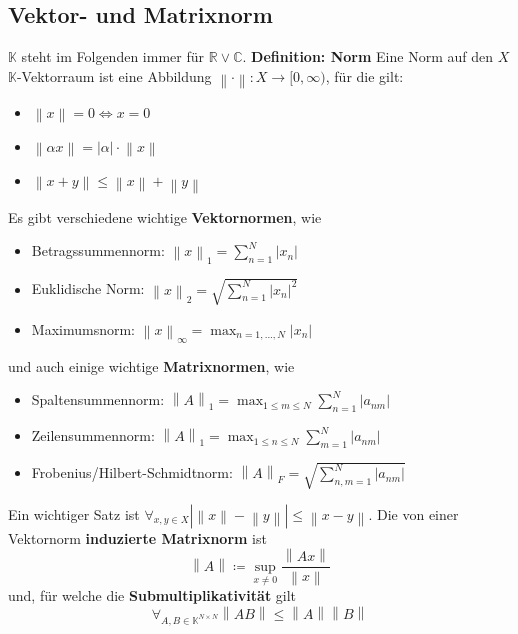 \documentclass{article}
\newcommand\norm[1]{\left\lVert#1\right\rVert}
\begin{document}
\subsection{Vektor- und Matrixnorm}
    $\mathbb{K}$ steht im Folgenden immer für $\mathbb{R}\vee\mathbb{C}$.\newline
    \textbf{Definition: Norm}\newline
    Eine Norm auf den $X$ $\mathbb{K}$-Vektorraum ist eine Abbildung 
    $\norm{\cdot}:X\rightarrow[0,\infty)$, für die gilt:
    \begin{itemize}
        \item $\norm{x}=0 \Leftrightarrow x=0$
        \item $\norm{\alpha x}=|\alpha|\cdot \norm{x}$
        \item $\norm{x+y}\le \norm{x}+\norm{y}$
    \end{itemize}
    Es gibt verschiedene wichtige \textbf{Vektornormen}, wie
    \begin{itemize}
        \item Betragssummennorm: $\norm{x}_1=\sum_{n=1}^N|x_n|$
        \item Euklidische Norm: $\norm{x}_2=\sqrt{\sum_{n=1}^N|x_n|^2}$
        \item Maximumsnorm: $\norm{x}_\infty=\max_{n=1,...,N}|x_n|$
    \end{itemize}
    und auch einige wichtige \textbf{Matrixnormen}, wie
    \begin{itemize}
        \item Spaltensummennorm: $\norm{A}_1=\max_{1\le m\le N}\sum_{n=1}^N|a_{nm}|$
        \item Zeilensummennorm: $\norm{A}_1=\max_{1\le n\le N}\sum_{m=1}^N|a_{nm}|$
        \item Frobenius/Hilbert-Schmidtnorm: $\norm{A}_F=\sqrt{\sum_{n,m=1}^N|a_{nm}|}$
    \end{itemize}
    Ein wichtiger Satz ist $\forall_{x,y\in X}|\norm{x}-\norm{y}|\le \norm{x-y}$.\newline
    Die von einer Vektornorm \textbf{induzierte Matrixnorm} ist
    \begin{equation}
        \norm{A}\coloneqq \sup_{x\not= 0}\frac{\norm{Ax}}{\norm{x}}
    \end{equation}
    und, für welche die \textbf{Submultiplikativität} gilt
    \begin{equation}
        \forall_{A,B\in\mathbb{K}^{N\times N}}\norm{AB}\le\norm{A}\norm{B}
    \end{equation}
\end{document}
